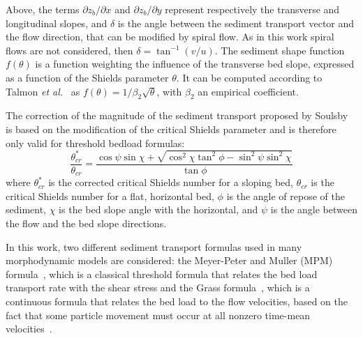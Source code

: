 Above, the terms $\partial z_b/\partial x$ and $\partial z_b/\partial y$ represent respectively the transverse and longitudinal slopes, and $\delta$ is the angle between the sediment transport vector and the flow direction, that can be modified by spiral flow. As in this work spiral flows are not considered, then $\delta = \tan^{-1}\left({v}/{u}\right)$. The sediment shape function $f(\theta)$ is a function weighting the influence of the transverse bed slope, expressed as a function of the Shields parameter $\theta$. It can be computed according to Talmon \textit{et al.}~\cite{Talmon95} as $f(\theta) = {1}/{\beta_2}\sqrt{\theta}$, with $\beta_2$ an empirical coefficient.


The correction of the magnitude of the sediment transport proposed by Soulsby~\cite{Soulsby97} is based on the modification of the critical Shields parameter and is therefore only valid for threshold bedload formulas:
\begin{equation*}
\frac{\theta_{cr}^*}{\theta_{cr}} = \frac{\cos\psi \sin\chi + 
\sqrt{\cos^2\chi \tan^2\phi - \sin^2\psi \sin^2\chi}}{\tan
\phi}
\end{equation*}
where $\theta_{cr}^*$ is the corrected critical Shields number for a sloping bed, $\theta_{cr}$ is the critical Shields number for a flat, horizontal bed, $\phi$ is the angle of repose of the sediment, $\chi$ is the bed slope angle with the horizontal, and $\psi$ is the angle between the flow and the bed slope directions.

In this work, two different sediment transport formulas used in many morphodynamic models are considered: the Meyer-Peter and Muller (MPM) formula~\cite{meyer1948formulas, doi:10.1061/9780784408148}, which is a classical threshold formula that relates the bed load transport rate with the shear stress and the Grass formula~\cite{Grass81}, which is a continuous formula that relates the bed load to the flow velocities, based on the fact that some particle movement must occur at all nonzero time-mean velocities~\cite{doi:10.1061/(ASCE)0733-9429(2002)128:3(306), Hudson2003, FLD:FLD853, diaz2008sediment}. 

